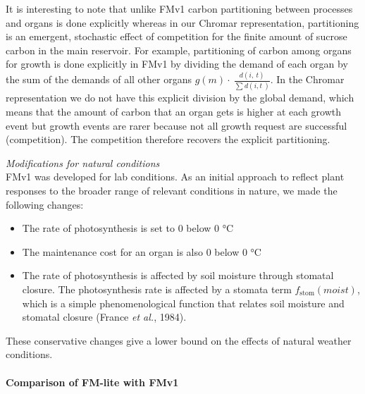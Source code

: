 \documentclass[phd]{infthesis}
\begin{document}
It is interesting to note that unlike FMv1 carbon partitioning between
processes and organs is done explicitly whereas in our Chromar
representation, partitioning is an emergent, stochastic effect of
competition for the finite amount of sucrose carbon in the main
reservoir. For example, partitioning of carbon among organs for growth
is done explicitly in FMv1 by dividing the demand of each organ by the
sum of the demands of all other organs
\(g\left( m \right) \cdot \ \frac{d(i,\ t)}{\sum_{}^{}{d(i,t\ )}}\). In
the Chromar representation we do not have this explicit division by the
global demand, which means that the amount of carbon that an organ gets
is higher at each growth event but growth events are rarer because not
all growth request are successful (competition). The competition
therefore recovers the explicit partitioning.

\emph{Modifications for natural conditions}\\
FMv1 was developed for lab conditions. As an initial approach to reflect
plant responses to the broader range of relevant conditions in nature,
we made the following changes:

\begin{itemize}
\item
  The rate of photosynthesis is set to 0 below 0 °C
\item
  The maintenance cost for an organ is also 0 below 0 °C
\item
  The rate of photosynthesis is affected by soil moisture through
  stomatal closure. The photosynthesis rate is affected by a stomata
  term \(f_{\text{stom}}(moist)\), which is a simple phenomenological
  function that relates soil moisture and stomatal closure (France
  \emph{et al.}, 1984).
\end{itemize}

These conservative changes give a lower bound on the effects of natural
weather conditions.

\paragraph{Comparison of FM-lite with
  FMv1}
\label{comparison-of-fm-lite-with-fmv1}
\end{document}
